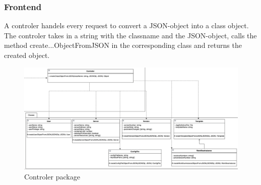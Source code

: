     \subsubsection{Frontend}
    	A controler handels every request to convert a JSON-object into a class object.
    	The controler takes in a string with the classname and the JSON-object, calls the 
    	method create...ObjectFromJSON in the corresponding class and returns the created object. 
    	\newpage
    	\begin{figure}[H]
            \label{API}
            \centerline{\includegraphics[scale=0.5]{res/Controler.png}}
            \caption{Controler package}
    	\end{figure}
